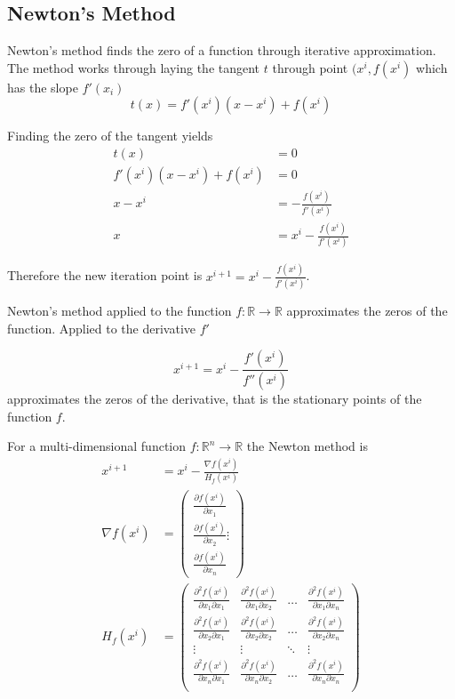 \documentclass[11pt]{article}
\begin{document}
\subsection{Newton's Method}

Newton's method finds the zero of a function through iterative approximation. The method works through laying the tangent $t$ through point $(x^i, f(x^i)$ which has the slope $f'(x_i)$
\begin{equation*}
	t(x) = f'(x^i)(x-x^i) + f(x^i)
\end{equation*}

\noindent
Finding the zero of the tangent yields
\begin{align*}
	t(x) &= 0\\
	f'(x^i)(x-x^i) + f(x^i) &= 0\\
	x - x^i &= - \frac{f(x^i)}{f'(x^i)}\\
	x &= x^i - \frac{f(x^i)}{f'(x^i)}
\end{align*}

\noindent
Therefore the new iteration point is $x^{i+1} = x^i - \frac{f(x^i)}{f'(x^i)}$.

Newton's method applied to the function $f: \mathbb{R} \rightarrow \mathbb{R}$ approximates the zeros of the function. Applied to the derivative $f'$

\begin{equation*}
	x^{i+1} = x^i - \frac{f'(x^i)}{f''(x^i)}
\end{equation*}
\noindent
approximates the zeros of the derivative, that is the stationary points of the function $f$.

For a multi-dimensional function $f: \mathbb{R}^n \rightarrow \mathbb{R}$ the Newton method is
\begin{align*}
	x^{i+1} &= x^i - \frac{\nabla f(x^i)}{H_f(x^i)}\\
	\nabla f(x^i) &= \begin{pmatrix}
		\frac{\partial f(x^i)}{\partial x_1}\\
		\frac{\partial f(x^i)}{\partial x_2}
		\vdots\\
		\frac{\partial f(x^i)}{\partial x_n}
	\end{pmatrix}\\
	H_f(x^i) &= \begin{pmatrix}
	\frac{\partial^2 f(x^i)}{\partial x_1\partial x_1} & \frac{\partial^2 f(x^i)}{\partial x_1\partial x_2} & \dots & \frac{\partial^2 f(x^i)}{\partial x_1\partial x_n}\\
	\frac{\partial^2 f(x^i)}{\partial x_2\partial x_1} & \frac{\partial^2 f(x^i)}{\partial x_2\partial x_2} & \dots & \frac{\partial^2 f(x^i)}{\partial x_2\partial x_n}\\
	\vdots & \vdots & \ddots & \vdots\\
	\frac{\partial^2 f(x^i)}{\partial x_n\partial x_1} & \frac{\partial^2 f(x^i)}{\partial x_n\partial x_2} & \dots & \frac{\partial^2 f(x^i)}{\partial x_n\partial x_n}\\
	\end{pmatrix}
\end{align*}
\end{document}
